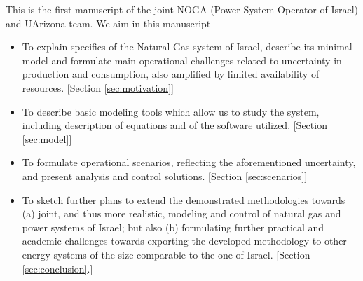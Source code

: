 This is the first manuscript of the joint NOGA (Power System Operator of Israel) and UArizona team. We aim in this manuscript
\begin{itemize}
    \item To explain specifics of the Natural Gas system of Israel, describe its minimal model and formulate main operational challenges related to uncertainty in production and consumption, also amplified by limited availability of resources. [Section \ref{sec:motivation}] 
    \item To describe basic modeling tools which allow us to study the system, including description of equations and of the software utilized. [Section \ref{sec:model}]
    \item To formulate operational scenarios, reflecting the aforementioned uncertainty, and present analysis and control solutions. [Section \ref{sec:scenarios}]
    \item To sketch further plans to extend the demonstrated methodologies towards (a) joint, and thus more realistic, modeling and control of natural gas and power systems of Israel; but also (b) formulating further practical and academic challenges towards exporting the developed methodology to other energy systems of the size comparable to the one of Israel. [Section \ref{sec:conclusion}.]
\end{itemize}